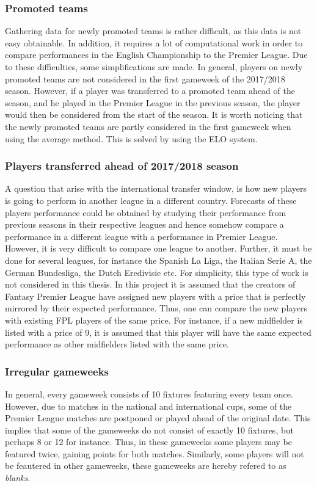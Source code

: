 \subsubsection{Promoted teams}
Gathering data for newly promoted teams is rather difficult, as this data is not easy obtainable. In addition, it requires a lot of computational work in order to compare performances in the English Championship to the Premier League. Due to these difficulties, some simplifications are made. In general, players on newly promoted teams are not considered in the first gameweek of the 2017/2018 season. However, if a player was transferred to a promoted team ahead of the season, and he played in the Premier League in the previous season, the player would then be considered from the start of the season. It is worth noticing that the newly promoted teams are partly considered in the first gameweek when using the average method. This is solved by using the ELO system. 
\subsubsection{Players transferred ahead of 2017/2018 season}
A question that arise with the international transfer window, is how new players is going to perform in another league in a different country. Forecasts of these players performance could be obtained by studying their performance from previous seasons in their respective leagues and hence somehow compare a performance in a different league with a performance in Premier League. However, it is very difficult to compare one league to another. Further, it must be done for several leagues, for instance the Spanish La Liga, the Italian Serie A, the German Bundesliga, the Dutch Eredivisie etc. For simplicity, this type of work is not considered in this thesis.
\newpar
In this project it is assumed that the creators of Fantasy Premier League have assigned new players with a price that is perfectly mirrored by their expected performance. Thus, one can compare the new players with existing FPL players of the same price. For instance, if a new midfielder is listed with a price of 9, it is assumed that this player will have the same expected performance as other midfielders listed with the same price.
\subsubsection{Irregular gameweeks}
In general, every gameweek consists of 10 fixtures featuring every team once. However, due to matches in the national and international cups, some of the Premier League matches are postponed or played ahead of the original date. This implies that some of the gameweeks do not consist of exactly 10 fixtures, but perhaps 8 or 12 for instance. Thus, in these gameweeks some players may be featured twice, gaining points for both matches. Similarly, some players will not be feautered in other gameweeks, these gameweeks are hereby refered to as \textit{blanks}.


